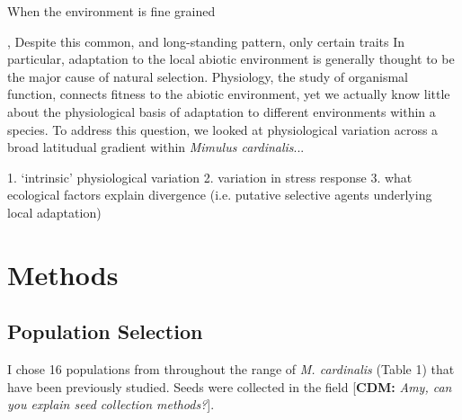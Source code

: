 \documentclass[11pt, oneside]{article}
\newcommand{\cdm}[1]{{ \color{magenta} [{\bf{CDM:}} {\em#1}]}} %
\begin{document}
When the environment is fine grained


, Despite this common, and long-standing pattern, only certain traits In particular, adaptation to the local abiotic environment is generally thought to be the major cause of natural selection. Physiology, the study of organismal function, connects fitness to the abiotic environment, yet we actually know little about the physiological basis of adaptation to different environments within a species. To address this question, we looked at physiological variation across a broad latitudual gradient within \textit{Mimulus cardinalis}...

1. `intrinsic' physiological variation
2. variation in stress response
3. what ecological factors explain divergence (i.e. putative selective agents underlying local adaptation)




\section*{Methods}

\subsection*{Population Selection}

I chose 16 populations from throughout the range of \textit{M. cardinalis} (Table 1) that have been previously studied. Seeds were collected in the field \cdm{Amy, can you explain seed collection methods?}.
\end{document}
